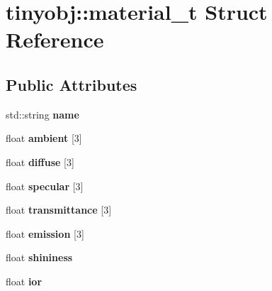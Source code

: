 \hypertarget{structtinyobj_1_1material__t}{}\section{tinyobj\+:\+:material\+\_\+t Struct Reference}
\label{structtinyobj_1_1material__t}
\subsection*{Public Attributes}
\begin{DoxyCompactItemize}
\item 
\mbox{\label{structtinyobj_1_1material__t_a41fde82dd0ec383b1d4ee258c4e4a1b9}} 
std\+::string {\bfseries name}
\item 
\mbox{\label{structtinyobj_1_1material__t_ac884a189d64cdacaf4f5caffb4eb36fd}} 
float {\bfseries ambient} \mbox{[}3\mbox{]}
\item 
\mbox{\label{structtinyobj_1_1material__t_ae8a87e008d2efe196c62b29d30e3dc0e}} 
float {\bfseries diffuse} \mbox{[}3\mbox{]}
\item 
\mbox{\label{structtinyobj_1_1material__t_a3a50cc4430f2900d39d6710c0c47dc61}} 
float {\bfseries specular} \mbox{[}3\mbox{]}
\item 
\mbox{\label{structtinyobj_1_1material__t_a6fe719f895172057ff5a6d10b8bb309b}} 
float {\bfseries transmittance} \mbox{[}3\mbox{]}
\item 
\mbox{\label{structtinyobj_1_1material__t_a946064836ea8a2bd6540c966c65f03e7}} 
float {\bfseries emission} \mbox{[}3\mbox{]}
\item 
\mbox{\label{structtinyobj_1_1material__t_a4f893e510fd30f63c687a8ad53000d15}} 
float {\bfseries shininess}
\item 
\mbox{\label{structtinyobj_1_1material__t_aaa7d5495ba26b249e2ea3c368b505b56}} 
float {\bfseries ior}
\item 
\mbox{\label{structtinyobj_1_1material__t_ac7dfb767305c4225c5b3a964acb9498d}} 

\end{DoxyCompactItemize}
